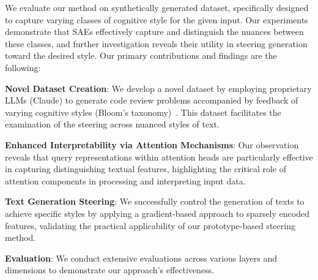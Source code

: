We evaluate our method on synthetically generated dataset, specifically designed to capture varying classes of cognitive style for the given input. Our experiments demonstrate that SAEs effectively capture and distinguish the nuances between these classes, and further investigation reveals their utility in steering generation toward the desired style. Our primary contributions and findings are the following:

\noindent\textbf{Novel Dataset Creation}: We develop a novel dataset by employing proprietary LLMs (Claude) to generate code review problems accompanied by feedback of varying cognitive styles (Bloom's taxonomy)~\cite{uugur2015self}. This dataset facilitates the examination of the steering across nuanced styles of text. 

    
    \noindent \textbf{Enhanced Interpretability via Attention Mechanisms}: Our observation reveals that query representations within attention heads are particularly effective in capturing distinguishing textual features, highlighting the critical role of attention components in processing and interpreting input data.

    \noindent \textbf{Text Generation Steering}: We successfully control the generation of texts to achieve specific styles by applying a gradient-based approach to sparsely encoded features, validating the practical applicability of our prototype-based steering method.

    
    \noindent \textbf{Evaluation}: We conduct extensive evaluations across various layers and dimensions to demonstrate our approach's effectiveness.


















